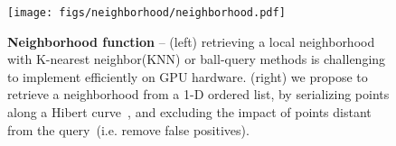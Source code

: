 \begin{figure}
    \centering
    \texttt{[image: figs/neighborhood/neighborhood.pdf]}
    \caption{
    \textbf{Neighborhood function} -- (left) retrieving a local neighborhood with K-nearest neighbor(KNN) or ball-query methods is challenging to implement efficiently on GPU hardware.
    (right) we propose to retrieve a neighborhood from a 1-D ordered list, by serializing points along a Hibert curve~\cite{hilbert1935stetige}, and excluding the impact of points distant from the query~(i.e. remove false positives).
    }
    \label{fig:neighbor_func}
\vspace{-1em}
\end{figure}
